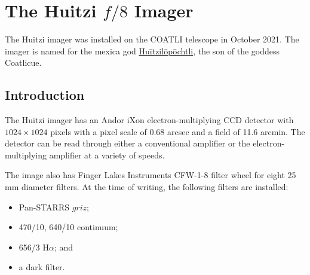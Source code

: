 
\chapter{The Huitzi $f/8$ Imager}
\label{appendix:instrument-huitzi-f8-f8}

The Huitzi imager was installed on the COATLI telescope in October 2021. The imager is named for the mexica god \href{https://en.wikipedia.org/wiki/Huītzilōpōchtli}{Huītzilōpōchtli}, the son of the goddess Coatlicue.

\section{Introduction}

The Huitzi imager has an Andor iXon electron-multiplying CCD detector with $1024\times1024$ pixels with a pixel scale of 0.68 arcsec and a field of 11.6 arcmin. The detector can be read through either a conventional amplifier or the electron-multiplying amplifier at a variety of speeds.

The image also has Finger Lakes Instruments CFW-1-8 filter wheel for eight 25 mm diameter filters. At the time of writing, the following filters are installed:
\begin{itemize}
    \item Pan-STARRS $griz$;
    \item 470/10, 640/10 continuum;
    \item 656/3 H$\alpha$; and
    \item a dark filter.
\end{itemize}

